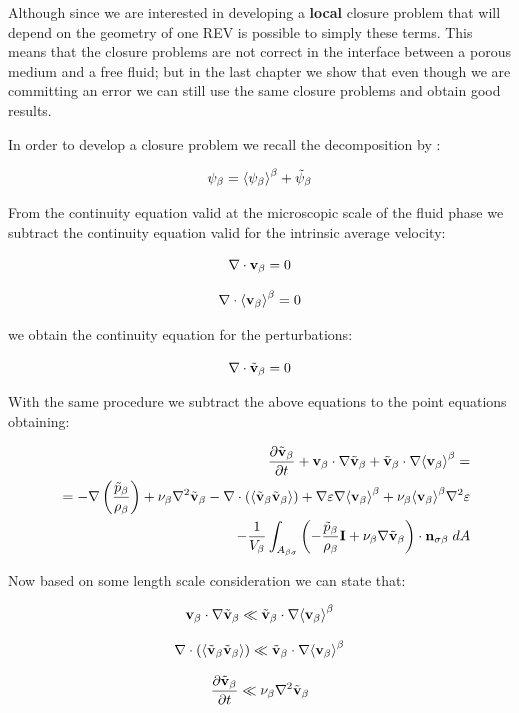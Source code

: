 Although since we are interested in developing a \textbf{local} closure problem that will depend on the geometry of one REV is possible to simply these terms.
This means that the closure problems are not correct in the interface between a porous medium and a free fluid; but in the last chapter we show that even though we are committing an error we can still use the same closure problems and obtain good results.

In order to develop a closure problem we recall the decomposition by \citet{gray1975derivation}:

\begin{equation}
\psi_{\beta} = {\left< \psi_{\beta} \right>}^{\beta} + \tilde{\psi}_{\beta}
\end{equation}

From the continuity equation valid at the microscopic scale of the fluid phase we subtract the continuity equation valid for the intrinsic average velocity:

$$
\nabla \cdot  \textbf{v}_{\beta}  = 0
$$

$$
\nabla \cdot  {\left< \textbf{v}_{\beta}\right>}^{\beta}  = 0 
$$

we obtain the continuity equation for the perturbations:

\begin{equation}
\nabla \cdot \tilde{\textbf{v}}_{\beta} = 0 
\end{equation}


With the same procedure we subtract the above equations to the point equations obtaining:

\begin{eqnarray}
&&  \dfrac{\partial \tilde{\textbf{v}}_{\beta}}{\partial t} + \textbf{v}_{\beta} \cdot \nabla \tilde{\textbf{v}}_{\beta} + \tilde{\textbf{v}}_{\beta} \cdot \nabla {\left< \textbf{v}_{\beta}\right>}^{\beta}  = \nonumber \\
&&= -\nabla \left(\dfrac{\tilde{p}_{\beta}}{\rho_{\beta}}\right) + \nu_{\beta} \nabla^2 \tilde{\textbf{v}}_{\beta} - \nabla \cdot \left({\left< \tilde{\textbf{v}}_{\beta} \tilde{\textbf{v}}_{\beta} \right>}\right) +  \nabla \varepsilon \nabla {\left< \textbf{v}_{\beta}\right>}^{\beta} + \nu_{\beta} {\left< \textbf{v}_{\beta} \right>}^{\beta} \nabla^2 \varepsilon \nonumber \\
&&- \dfrac{1}{V_\beta} \int_{A_{\beta \sigma}} \left(-\dfrac{\tilde{p}_{\beta}}{\rho_{\beta}} \mathbf{I}  + \nu_{\beta} \nabla \tilde{\textbf{v}}_{\beta} \right) \cdot \mathbf{n}_{\sigma \beta} \;dA
\label{eq:vans_mom_3}
\end{eqnarray}

Now based on some length scale consideration we can state that:

$$ 
\textbf{v}_{\beta} \cdot \nabla \tilde{\textbf{v}}_{\beta} \ll \tilde{\textbf{v}}_{\beta} \cdot \nabla {\left< \textbf{v}_{\beta}\right>}^{\beta}
$$

$$
\nabla \cdot \left({\left< \tilde{\textbf{v}}_{\beta} \tilde{\textbf{v}}_{\beta} \right>}\right) \ll \tilde{\textbf{v}}_{\beta} \cdot \nabla {\left< \textbf{v}_{\beta}\right>}^{\beta}
$$

$$
\dfrac{\partial \tilde{\textbf{v}}_{\beta}}{\partial t} \ll \nu_{\beta} \nabla^2 \tilde{\textbf{v}}_{\beta}
$$

